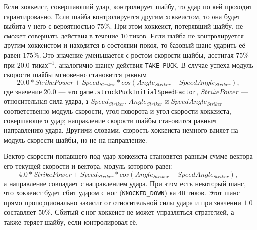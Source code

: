 \begin{itemize}
\begin{itemize}
          Если хоккеист, совершающий удар, контролирует шайбу, то удар по ней проходит гарантированно. Если шайба контролируется другим
          хоккеистом, то она будет выбита у него с вероятностью $75\%$. При этом хоккеист, потерявший шайбу, не сможет совершать действия
          в течение $10$ тиков. Если шайба не контролируется другим хоккеистом и находится в состоянии покоя, то базовый шанс ударить её
          равен $175\%$. Это значение уменьшается с ростом скорости шайбы, достигая $75\%$ при $20.0$ тиках$^{-1}$, аналогично шансу
          действия \texttt{TAKE\_PUCK}. В случае успеха модуль скорости шайбы мгновенно становится равным
          \begin{equation}
          20.0*StrikePower+Speed_{Striker}*cos(Angle_{Striker}-SpeedAngle_{Striker}),
          \end{equation}
          где значение $20.0$ --- это \texttt{game.struckPuckInitialSpeedFactor}, $StrikePower$ --- относительная сила удара, а
          $Speed_{Striker}$, $Angle_{Striker}$ и $SpeedAngle_{Striker}$ --- соответственно модуль скорости, угол поворота и угол скорости
          хоккеиста, совершающего удар; направление скорости шайбы становится равным направлению удара. Другими словами, скорость хоккеиста
          немного влияет на модуль скорости шайбы, но не на направление.

          Вектор скорости попавшего под удар хоккеиста становится равным сумме вектора его текущей скорости и вектора, модуль которого
          равен
          \begin{equation}
          4.0*StrikePower+Speed_{Striker}*cos(Angle_{Striker}-SpeedAngle_{Striker}),
          \end{equation}
          а направление совпадает с направлением удара. При этом есть некоторый шанс, что хоккеист будет сбит ударом с ног
          (\texttt{KNOCKED\_DOWN}) на $40$ тиков. Этот шанс прямо пропорционально зависит от относительной силы удара и при значении $1.0$
          составляет $50\%$. Сбитый с ног хоккеист не может управляться стратегией, а также теряет шайбу, если контролировал её.


\end{itemize}
\end{itemize}

